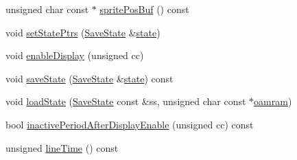 \begin{DoxyCompactItemize}
\item 
unsigned char const  $\ast$ \hyperlink{classgambatte_1_1SpriteMapper_1_1OamReader_a3080a3d42e877551ec8dde8724223053}{sprite\+Pos\+Buf} () const
\item 
void \hyperlink{classgambatte_1_1SpriteMapper_1_1OamReader_a8d8e0989e0c2ae58034ed6c08be33bc9}{set\+State\+Ptrs} (\hyperlink{structgambatte_1_1SaveState}{Save\+State} \&\hyperlink{ppu_8cpp_a2f2eca6997ee7baf8901725ae074d45b}{state})
\item 
void \hyperlink{classgambatte_1_1SpriteMapper_1_1OamReader_ac59cd90aa85b5155eb6ab14dc6f01115}{enable\+Display} (unsigned cc)
\item 
void \hyperlink{classgambatte_1_1SpriteMapper_1_1OamReader_a937011ba446debb723dbb3ae98007936}{save\+State} (\hyperlink{structgambatte_1_1SaveState}{Save\+State} \&\hyperlink{ppu_8cpp_a2f2eca6997ee7baf8901725ae074d45b}{state}) const
\item 
void \hyperlink{classgambatte_1_1SpriteMapper_1_1OamReader_a58347ffdbab3873820b3570cbca370b0}{load\+State} (\hyperlink{structgambatte_1_1SaveState}{Save\+State} const \&ss, unsigned char const $\ast$\hyperlink{classgambatte_1_1SpriteMapper_a558ee1ff5817b79285f7cc91d627535b}{oamram})
\item 
bool \hyperlink{classgambatte_1_1SpriteMapper_1_1OamReader_ae3864e972f2371a24a0bdbe849b4d6fa}{inactive\+Period\+After\+Display\+Enable} (unsigned cc) const
\item 
unsigned \hyperlink{classgambatte_1_1SpriteMapper_1_1OamReader_a4a3b93efd1551abe299c9274473286af}{line\+Time} () const
\end{DoxyCompactItemize}
